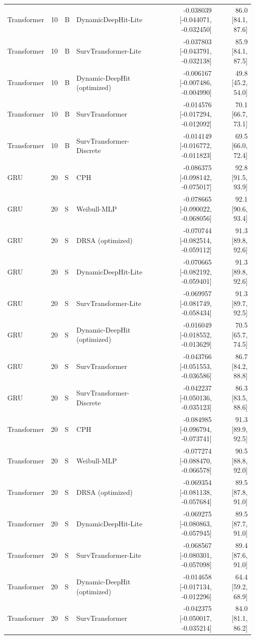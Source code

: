 \begin{longtable}{lll p{3.0cm} rr}
Transformer & 10 & B & DynamicDeepHit-Lite & -0.038039 [-0.044071, -0.032450] & 86.0 [84.1, 87.6]\\
Transformer & 10 & B & SurvTransformer-Lite & -0.037803 [-0.043791, -0.032138] & 85.9 [84.1, 87.5]\\
Transformer & 10 & B & Dynamic-DeepHit (optimized) & -0.006167 [-0.007486, -0.004990] & 49.8 [45.2, 54.0]\\
Transformer & 10 & B & SurvTransformer & -0.014576 [-0.017294, -0.012092] & 70.1 [66.7, 73.1]\\
Transformer & 10 & B & SurvTransformer-Discrete & -0.014149 [-0.016772, -0.011823] & 69.5 [66.0, 72.4]\\
GRU & 20 & S & CPH & -0.086375 [-0.098142, -0.075017] & 92.8 [91.5, 93.9]\\
GRU & 20 & S & Weibull-MLP & -0.078665 [-0.090022, -0.068056] & 92.1 [90.6, 93.4]\\
GRU & 20 & S & DRSA (optimized) & -0.070744 [-0.082514, -0.059112] & 91.3 [89.8, 92.6]\\
GRU & 20 & S & DynamicDeepHit-Lite & -0.070665 [-0.082192, -0.059401] & 91.3 [89.8, 92.6]\\
GRU & 20 & S & SurvTransformer-Lite & -0.069957 [-0.081749, -0.058434] & 91.3 [89.7, 92.5]\\
GRU & 20 & S & Dynamic-DeepHit (optimized) & -0.016049 [-0.018552, -0.013629] & 70.5 [65.7, 74.5]\\
GRU & 20 & S & SurvTransformer & -0.043766 [-0.051553, -0.036586] & 86.7 [84.2, 88.8]\\
GRU & 20 & S & SurvTransformer-Discrete & -0.042237 [-0.050136, -0.035123] & 86.3 [83.5, 88.6]\\
Transformer & 20 & S & CPH & -0.084985 [-0.096794, -0.073741] & 91.3 [89.9, 92.5]\\
Transformer & 20 & S & Weibull-MLP & -0.077274 [-0.088470, -0.066578] & 90.5 [88.8, 92.0]\\
Transformer & 20 & S & DRSA (optimized) & -0.069354 [-0.081138, -0.057684] & 89.5 [87.8, 91.0]\\
Transformer & 20 & S & DynamicDeepHit-Lite & -0.069275 [-0.080863, -0.057945] & 89.5 [87.7, 91.0]\\
Transformer & 20 & S & SurvTransformer-Lite & -0.068567 [-0.080301, -0.057098] & 89.4 [87.6, 91.0]\\
Transformer & 20 & S & Dynamic-DeepHit (optimized) & -0.014658 [-0.017134, -0.012296] & 64.4 [59.2, 68.9]\\
Transformer & 20 & S & SurvTransformer & -0.042375 [-0.050017, -0.035214] & 84.0 [81.1, 86.2]\\

\end{longtable}
